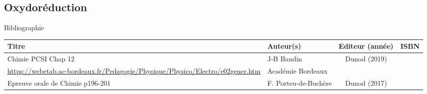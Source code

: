 \begin{headerBlock}
\chapter{Oxydoréduction}
\label{LC_Oxydoreduction_STI2D}
 \end{headerBlock}



\begin{reportBlock}{Bibliographie}

\begin{center}
\begin{tabularx}{\textwidth}{| X | X | c | c |}\hline
Titre & Auteur(s) & Editeur (année) & ISBN \\ \hline
 Chimie PCSI Chap 12 & J-B Baudin & Dunod (2019) &  \\ 
 \hline
 \url{https://webetab.ac-bordeaux.fr/Pedagogie/Physique/Physico/Electro/e02gener.htm} & Académie Bordeaux & & \\
 \hline
 Epreuve orale de Chimie p196-201 & F. Porteu-de-Buchère & Dunod (2017) & \\
 
\end{tabularx}
\end{center}

\end{reportBlock}

